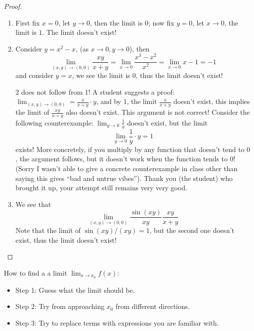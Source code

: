 \documentclass[openany]{book}
\begin{document}
\begin{proof}
    \begin{enumerate}
        \item First fix $x=0$, let $y\to 0$, then the limit is $0$; now fix $y=0$, let $x\to 0$, the limit is $1$. The limit doesn't exist!
        \item Consider $y=x^2-x$, (as $x\to0, y\to 0$), then 
        \begin{equation*}
            \lim_{(x,y)\to(0,0)}\frac{xy}{x+y}=\lim_{x\to 0}\frac{x^3-x^2}{x^2}=\lim_{x\to 0}x-1=-1
        \end{equation*}
        and consider $y=x$, we see the limit is $0$, thus the limit doesn't exist!
        \begin{warn}
            2 does not follow from 1! A student suggests a proof: $\lim_{(x,y)\to(0,0)}=\frac{x}{x+y}\cdot y$, and by 1, the limit $\frac{x}{x+y}$ doesn't exist, this implies the limit of $\frac{xy}{x+y}$ also doesn't exist. This argument is not correct! Consider the following counterexample: $\lim_{y\to 0}\frac{1}{y}$ doesn't exist, but the limit
            \begin{equation*}
                \lim_{y\to 0}\frac{1}{y}\cdot y=1
            \end{equation*}
            exists! More concretely, if you multiply by any function that doesn't tend to $0$, the argument follows, but it doesn't work when the function tends to $0$! (Sorry I wasn't able to give a concrete counterexample in class other than saying this gives ``bad and untrue vibes''). Thank you (the student) who brought it up, your attempt still remains very very good.
        \end{warn}
        \item We see that 
        \begin{equation*}
            \lim_{(x,y)\to(0,0)}\frac{\sin(xy)}{xy}\frac{xy}{x+y}
        \end{equation*}
        Note that the limit of $\sin(xy)/(xy)=1$, but the second one doesn't exist, thus the limit doesn't exist!
    \end{enumerate}
\end{proof}


\noindent
How to find a a limit $\lim_{x\to x_0}f(x)$:
\begin{itemize}
    \item Step 1: Guess what the limit should be.
    \item Step 2: Try from approaching $x_0$ from different directions.
    \item Step 3: Try to replace terms with expressions you are familiar with.
\end{itemize}
\end{document}
